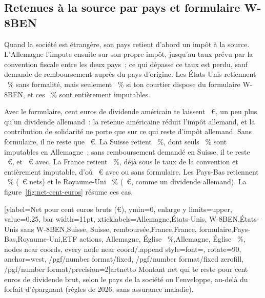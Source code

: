 \subsection{Retenues \`a la source par pays et formulaire W-8BEN}\label{sec:fisc-quellensteuer}

Quand la soci\'et\'e est \'etrang\`ere, son pays retient d'abord un imp\^ot \`a la source.
L'Allemagne l'impute ensuite sur son propre imp\^ot, jusqu'au taux pr\'evu par la convention fiscale
entre les deux pays~; ce qui d\'epasse ce taux est perdu, sauf demande de remboursement aupr\`es du pays
d'origine. Les \'Etats-Unis retiennent \QstUsStandard~\% sans formalit\'e, mais
seulement \QstUsFormulaire~\% si ton courtier dispose du formulaire W-8BEN, et ces \QstUsFormulaire~\%
sont enti\`erement imputables.


Avec le formulaire, cent euros de dividende am\'ericain te laissent \NettoUs~€, un peu plus qu'un
dividende allemand~: la retenue am\'ericaine r\'eduit l'imp\^ot allemand, et la contribution de
solidarit\'e ne porte que sur ce qui reste d'imp\^ot allemand. Sans formulaire, il ne reste que
\NettoUsSansFormulaire~€. La Suisse retient \QstCh~\%, dont seuls \QstChAnrechenbar~\% sont imputables
en Allemagne~: sans remboursement demand\'e en Suisse, il te reste \NettoCh~€, et \NettoChRemboursement~€
avec. La France retient \QstFr~\%, d\'ej\`a sous le taux de la convention et enti\`erement imputable,
d'o\`u \NettoFr~€ avec ou sans formulaire. Les Pays-Bas retiennent \QstNl~\% (\NettoNl~€ nets) et le
Royaume-Uni \QstGb~\% (\NettoGb~€, comme un dividende allemand). La figure~\ref{fig:net-cent-euros}
r\'esume ces cas.

[ylabel={Net pour cent euros bruts (€)},
  ymin=0, enlarge y limits={upper, value=0.25}, bar width=11pt,
  xticklabels={{Allemagne},{\'Etats-Unis, W-8BEN},{\'Etats-Unis sans W-8BEN},{Suisse},
    {Suisse, rembours\'ee},{France},{France, formulaire},{Pays-Bas},{Royaume-Uni},{ETF actions},
    {Allemagne, \'Eglise \KistAcht~\%},{Allemagne, \'Eglise \KistNeun~\%}},
  nodes near coords, every node near coord/.append style={font=\tiny, rotate=90, anchor=west,
    /pgf/number format/fixed, /pgf/number format/fixed zerofill, /pgf/number format/precision=2}]{art}{netto}%
  {Montant net qui te reste pour cent euros de dividende brut, selon le pays de la soci\'et\'e ou
  l'enveloppe, au-del\`a du forfait d'\'epargnant (r\`egles de 2026, sans assurance
  maladie).\label{fig:net-cent-euros}}

